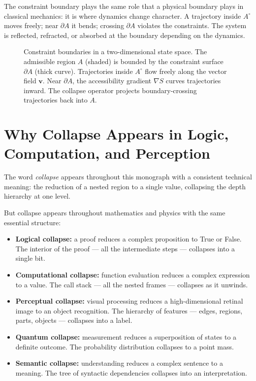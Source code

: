 The constraint boundary plays the same role that a physical boundary plays
in classical mechanics: it is where dynamics change character. A trajectory
inside $A^\circ$ moves freely; near $\partial A$ it bends; crossing $\partial A$
violates the constraints. The system is reflected, refracted, or absorbed
at the boundary depending on the dynamics.

\begin{figure}[h]
  \centering
  \begin{tikzpicture}[scale=1.0]
    
  \end{tikzpicture}
  \caption{Constraint boundaries in a two-dimensional state space.
    The admissible region $A$ (shaded) is bounded by the constraint
    surface $\partial A$ (thick curve). Trajectories inside $A^\circ$
    flow freely along the vector field $\mathbf{v}$. Near $\partial A$,
    the accessibility gradient $\nabla S$ curves trajectories inward.
    The collapse operator projects boundary-crossing trajectories
    back into $A$.}
  \label{fig:constraint-boundary}
\end{figure}

\section{Why Collapse Appears in Logic, Computation, and Perception}

The word \emph{collapse} appears throughout this monograph with a consistent
technical meaning: the reduction of a nested region to a single value,
collapsing the depth hierarchy at one level.

But collapse appears throughout mathematics and physics with the same
essential structure:

\begin{itemize}
  \item \textbf{Logical collapse:} a proof reduces a complex proposition
        to True or False. The interior of the proof — all the intermediate
        steps — collapses into a single bit.
  \item \textbf{Computational collapse:} function evaluation reduces
        a complex expression to a value. The call stack — all the nested
        frames — collapses as it unwinds.
  \item \textbf{Perceptual collapse:} visual processing reduces a
        high-dimensional retinal image to an object recognition. The
        hierarchy of features — edges, regions, parts, objects — collapses
        into a label.
  \item \textbf{Quantum collapse:} measurement reduces a superposition
        of states to a definite outcome. The probability distribution
        collapses to a point mass.
  \item \textbf{Semantic collapse:} understanding reduces a complex
        sentence to a meaning. The tree of syntactic dependencies collapses
        into an interpretation.
\end{itemize}

